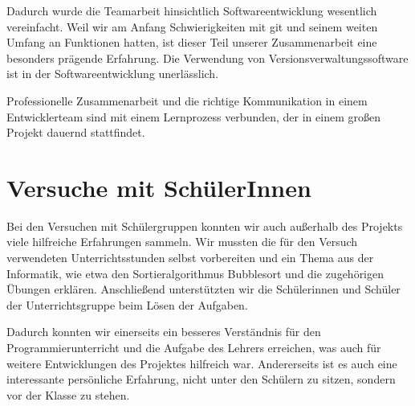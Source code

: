 Dadurch wurde die Teamarbeit hinsichtlich Softwareentwicklung wesentlich vereinfacht. Weil wir am Anfang Schwierigkeiten mit git und seinem weiten Umfang an Funktionen hatten, ist dieser Teil unserer Zusammenarbeit eine besonders prägende Erfahrung. Die Verwendung von Versionsverwaltungssoftware ist in der Softwareentwicklung unerlässlich.

Professionelle Zusammenarbeit und die richtige Kommunikation in einem Entwicklerteam sind mit einem Lernprozess verbunden, der in einem großen Projekt dauernd stattfindet.

\section{Versuche mit SchülerInnen}
Bei den Versuchen mit Schülergruppen konnten wir auch außerhalb des Projekts viele hilfreiche Erfahrungen sammeln. Wir mussten die für den Versuch verwendeten Unterrichtsstunden selbst vorbereiten und ein Thema aus der Informatik, wie etwa den Sortieralgorithmus \glqq{}Bubblesort\grqq{} und die zugehörigen Übungen erklären. Anschließend unterstützten wir die Schülerinnen und Schüler der Unterrichtsgruppe beim Lösen der Aufgaben.

Dadurch konnten wir einerseits ein besseres Verständnis für den Programmierunterricht und die Aufgabe des Lehrers erreichen, was auch für weitere Entwicklungen des Projektes hilfreich war. Andererseits ist es auch eine interessante persönliche Erfahrung, nicht unter den Schülern zu sitzen, sondern vor der Klasse zu stehen.